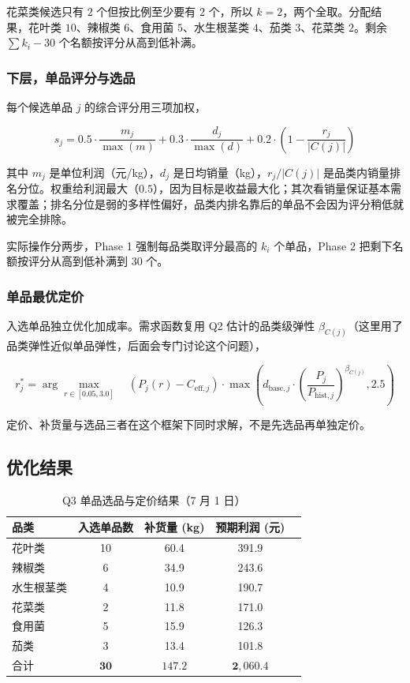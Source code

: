 花菜类候选只有 $2$ 个但按比例至少要有 $2$ 个，所以 $k=2$，两个全取。分配结果，花叶类 $10$、辣椒类 $6$、食用菌 $5$、水生根茎类 $4$、茄类 $3$、花菜类 $2$。剩余 $\sum k_i - 30$ 个名额按评分从高到低补满。

\subsubsection{下层，单品评分与选品}

每个候选单品 $j$ 的综合评分用三项加权，

\begin{equation}
s_j = 0.5 \cdot \frac{m_j}{\max(m)} + 0.3 \cdot \frac{d_j}{\max(d)} + 0.2 \cdot \left(1 - \frac{r_j}{|C(j)|}\right)
\end{equation}

其中 $m_j$ 是单位利润（元/kg），$d_j$ 是日均销量（kg），$r_j/|C(j)|$ 是品类内销量排名分位。权重给利润最大（$0.5$），因为目标是收益最大化；其次看销量保证基本需求覆盖；排名分位是弱的多样性偏好，品类内排名靠后的单品不会因为评分稍低就被完全排除。

实际操作分两步，Phase 1 强制每品类取评分最高的 $k_i$ 个单品，Phase 2 把剩下名额按评分从高到低补满到 $30$ 个。

\subsubsection{单品最优定价}

入选单品独立优化加成率。需求函数复用 Q2 估计的品类级弹性 $\beta_{C(j)}$（这里用了品类弹性近似单品弹性，后面会专门讨论这个问题），

\begin{equation}
r_j^* = \arg\max_{r \in [0.05, 3.0]} \quad (P_j(r) - C_{\text{eff},j}) \cdot \max\left(d_{\text{base},j} \cdot \left(\frac{P_j}{P_{\text{hist},j}}\right)^{\beta_{C(j)}}, 2.5\right)
\end{equation}

定价、补货量与选品三者在这个框架下同时求解，不是先选品再单独定价。

\subsection{优化结果}

\begin{table}[H]
\centering
\caption{Q3 单品选品与定价结果（7 月 1 日）}
\label{tab:q3_results}
\begin{tabular}{lcccc}
\hline
品类 & 入选单品数 & 补货量 (kg) & 预期利润 (元) \\
\hline
花叶类 & 10 & 60.4 & 391.9 \\
辣椒类 & 6 & 34.9 & 243.6 \\
水生根茎类 & 4 & 10.9 & 190.7 \\
花菜类 & 2 & 11.8 & 171.0 \\
食用菌 & 5 & 15.9 & 126.3 \\
茄类 & 3 & 13.4 & 101.8 \\
\hline
合计 & $\mathbf{30}$ & $\mathbf{147.2}$ & $\mathbf{2,060.4}$ \\
\hline
\end{tabular}
\end{table}

